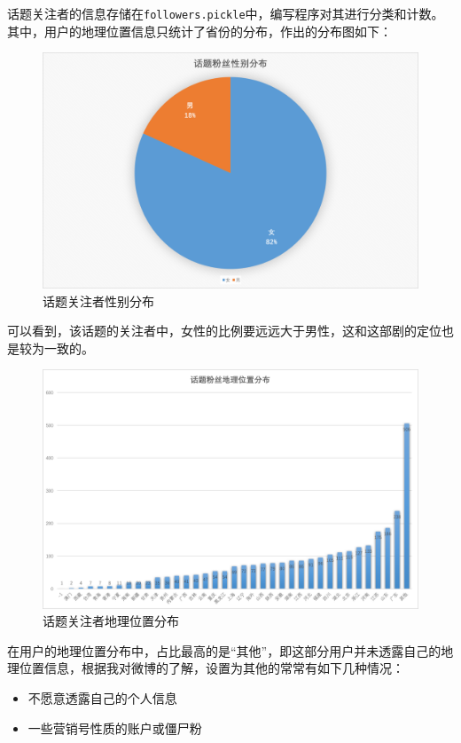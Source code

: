 \documentclass[a4paper,UTF8]{ctexart}
\providecommand{\tightlist}{%
  \setlength{\itemsep}{0pt}\setlength{\parskip}{0pt}}
\begin{document}
话题关注者的信息存储在\texttt{followers.pickle}中，编写程序对其进行分类和计数。其中，用户的地理位置信息只统计了省份的分布，作出的分布图如下：

\begin{figure}[htbp]
\centering
\includegraphics{img/followers_gender.png}
\caption{话题关注者性别分布}
\end{figure}

可以看到，该话题的关注者中，女性的比例要远远大于男性，这和这部剧的定位也是较为一致的。

\begin{figure}[htbp]
\centering
\includegraphics{img/followers_location.png}
\caption{话题关注者地理位置分布}
\end{figure}

在用户的地理位置分布中，占比最高的是``其他''，即这部分用户并未透露自己的地理位置信息，根据我对微博的了解，设置为其他的常常有如下几种情况：

\begin{itemize}
\tightlist
\item
  不愿意透露自己的个人信息
\item
  一些营销号性质的账户或僵尸粉
\end{itemize}
\end{document}
